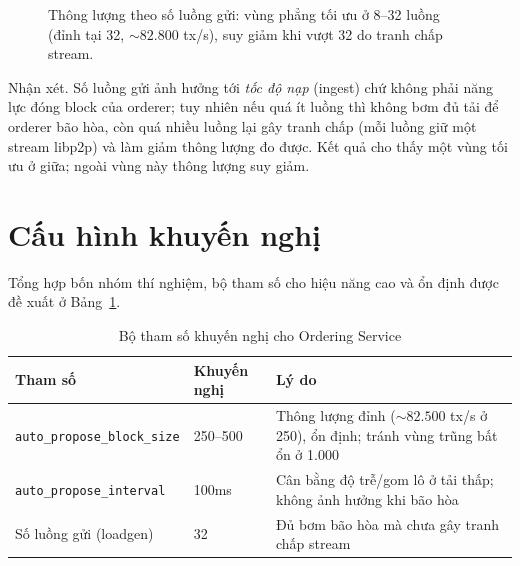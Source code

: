 \begin{figure}[H]
\centering
{}
\caption{Thông lượng theo số luồng gửi: vùng phẳng tối ưu ở 8--32 luồng (đỉnh tại
32, ${\sim}82.800$ tx/s), suy giảm khi vượt 32 do tranh chấp stream.}
\label{fig:eval-workers}
\end{figure}

Nhận xét. Số luồng gửi ảnh hưởng tới \textit{tốc độ nạp} (ingest) chứ
không phải năng lực đóng block của orderer; tuy nhiên nếu quá ít luồng thì không
bơm đủ tải để orderer bão hòa, còn quá nhiều luồng lại gây tranh chấp (mỗi luồng
giữ một stream libp2p) và làm giảm thông lượng đo được. Kết quả cho thấy một vùng
tối ưu ở giữa; ngoài vùng này thông lượng suy giảm.

\section{Cấu hình khuyến nghị}
\label{sec:eval-best}

Tổng hợp bốn nhóm thí nghiệm, bộ tham số cho hiệu năng cao và ổn định được đề
xuất ở Bảng~\ref{tab:eval-best}.

\begin{table}[H]
\centering
\caption{Bộ tham số khuyến nghị cho Ordering Service}
\label{tab:eval-best}
\begin{tabular}{@{}p{4.2cm}p{3cm}p{5.3cm}@{}}
\toprule
\textbf{Tham số} & \textbf{Khuyến nghị} & \textbf{Lý do} \\
\midrule
\texttt{auto\_propose\_block\_size} & 250--500 & Thông lượng đỉnh (${\sim}82.500$ tx/s ở 250), ổn định; tránh vùng trũng bất ổn ở 1.000 \\
\texttt{auto\_propose\_interval} & 100ms & Cân bằng độ trễ/gom lô ở tải thấp; không ảnh hưởng khi bão hòa \\
Số luồng gửi (loadgen) & 32 & Đủ bơm bão hòa mà chưa gây tranh chấp stream \\
\bottomrule
\end{tabular}
\end{table}

